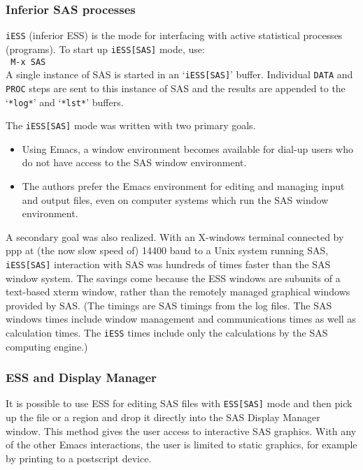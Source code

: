\documentclass{article}
\newcommand{\stexttt}[1]{{\small\texttt{#1}}}
\newcommand{\ssf}[1]{{\small\sf{#1}}}
\newcommand{\elcode}[1]{\\{\stexttt{\hspace*{2em} #1}}\\}
\newcommand{\file}[1]{`\stexttt{#1}'}
\begin{document}
\subsubsection{Inferior SAS processes}
\label{sec:SAS:proc:inf}

\stexttt{iESS} (inferior ESS) is the mode for interfacing with active
statistical processes (programs).  To start up \stexttt{iESS[SAS]} mode, use:
\elcode{M-x SAS}
A single instance of SAS is started in an \file{iESS[SAS]} buffer.  Individual
\stexttt{DATA} and \stexttt{PROC} steps are sent to this instance of SAS and the results
are appended to the \file{*log*} and \file{*lst*} buffers.

The \stexttt{iESS[SAS]} mode was written with two primary goals.
\begin{itemize}
\item Using Emacs, a window environment becomes available for dial-up
  users who do not have access to the SAS window environment.
\item The authors prefer the Emacs environment for editing and
  managing input and output files, even on computer systems which run
  the SAS window environment.
\end{itemize}
A secondary goal was also realized.  With an X-windows
terminal connected by ppp at (the now slow speed of)
14400 baud to a Unix system running SAS,
\stexttt{iESS[SAS]} interaction with SAS was hundreds of times faster than the
SAS window system.  The savings come because the ESS windows are
subunits of a text-based xterm window, rather than the remotely
managed graphical windows provided by SAS.  (The timings are SAS
timings from the log files.  The SAS windows times include window
management and communications times as well as calculation times.  The
\stexttt{iESS} times include only the calculations by the SAS computing engine.)

\subsubsection{ESS and Display Manager}
It is possible to use ESS for editing SAS files with \stexttt{ESS[SAS]} mode
and then pick up the file or a region and drop it directly into the SAS
Display Manager \ssf{Program Editor} window.
This method gives the user access to
interactive SAS graphics.  With any of the other Emacs interactions, the user
is limited to static graphics, for example by printing to a postscript device.
\end{document}
